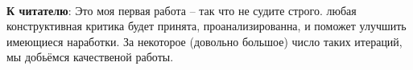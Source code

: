\documentclass[twoside, a3paper]{report}
\begin{document}
\

\textbf{К читателю}: Это моя первая работа -- так что не судите строго. любая конструктивная критика будет принята, проанализированна, и поможет улучшить имеющиеся наработки. За некоторое (довольно большое) число таких итераций, мы добьёмся качественой работы.


\tableofcontents




















%
\end{document}
